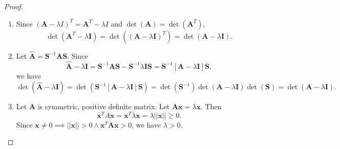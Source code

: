 \documentclass[12pt,openany]{book}
\theoremstyle{definition}
\newcommand{\norms}[1]{|| #1||}
\renewcommand{\vec}[1]{\textbf{#1}}
\begin{document}
	\begin{proof}
		\begin{enumerate}[(1)]
			\item Since \((\textbf{A}-\lambda I)^T=\textbf{A}^T-\lambda I\) and \(\det(\textbf{A})=\det(\textbf{A}^T)\), \[
			\det(\textbf{A}^T-\lambda \textbf{I})=\det((\textbf{A}-\lambda \textbf{I})^T)=\det(\textbf{A}-\lambda\textbf{I}).
			\]
			\item Let \(\hat{\textbf{A}}=\textbf{S}^{-1}\textbf{A}\textbf{S}\). Since \[
			\hat{\textbf{A}}-\lambda\textbf{I}=\textbf{S}^{-1}\textbf{A}\textbf{S}-\textbf{S}^{-1}\lambda\textbf{I}\textbf{S}=\textbf{S}^{-1}[\textbf{A}-\lambda\textbf{I}]\textbf{S},
			\] we have \[
			\det(\hat{\textbf{A}}-\lambda\textbf{I})=\det(\textbf{S}^{-1}[\textbf{A}-\lambda\textbf{I}]\textbf{S})=\det(\textbf{S}^{-1})\det(\textbf{A}-\lambda\textbf{I})\det(\textbf{S})=\det(\textbf{A}-\lambda\textbf{I}).
			\]
			\item Let \(\textbf{A}\) is symmetric, positive definite matrix. Let \(\textbf{A}\textbf{x}=\lambda\vec{x}\). Then \[
			\textbf{x}^TA\textbf{x}=\textbf{x}^T\lambda\vec{x}=\lambda\norms{\vec{x}}\geq 0.
			\] Since \(\vec{x}\neq 0\implies\norms{\vec{x}}>0\land\vec{x}^T\textbf{A}\vec{x}>0\), we have \(\lambda>0\).
		\end{enumerate}
	\end{proof}
	\vspace{4pt}
\end{document}
